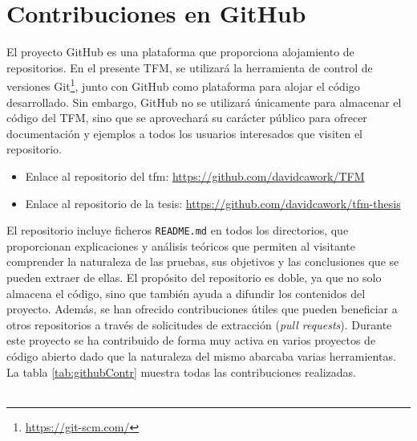 \section{Contribuciones en GitHub}
\label{sec:estadoArte_github}


El proyecto GitHub es una plataforma que proporciona alojamiento de repositorios. En el presente TFM, se utilizará la herramienta de control de versiones Git\footnote{\url{https://git-scm.com/}}, junto con GitHub como plataforma para alojar el código desarrollado. Sin embargo, GitHub no se utilizará únicamente para almacenar el código del TFM, sino que se aprovechará su carácter público para ofrecer documentación y ejemplos a todos los usuarios interesados que visiten el repositorio. \\
\par
\begin{itemize}
    \item Enlace al repositorio del \gls{tfm}: \url{https://github.com/davidcawork/TFM}
    \item Enlace al repositorio de la tesis: \url{https://github.com/davidcawork/tfm-thesis}
\end{itemize}
\vspace{0.5cm}

El repositorio incluye ficheros \texttt{README.md} en todos los directorios, que proporcionan explicaciones y análisis teóricos que permiten al visitante comprender la naturaleza de las pruebas, sus objetivos y las conclusiones que se pueden extraer de ellas. El propósito del repositorio es doble, ya que no solo almacena el código, sino que también ayuda a difundir los contenidos del proyecto. Además, se han ofrecido contribuciones útiles que pueden beneficiar a otros repositorios a través de solicitudes de extracción (\textit{pull requests}). Durante este proyecto se ha contribuido de forma muy activa en varios proyectos de código abierto dado que la naturaleza del mismo abarcaba varias herramientas.  La tabla \ref{tab:githubContr} muestra todas las contribuciones realizadas.\\
\\

